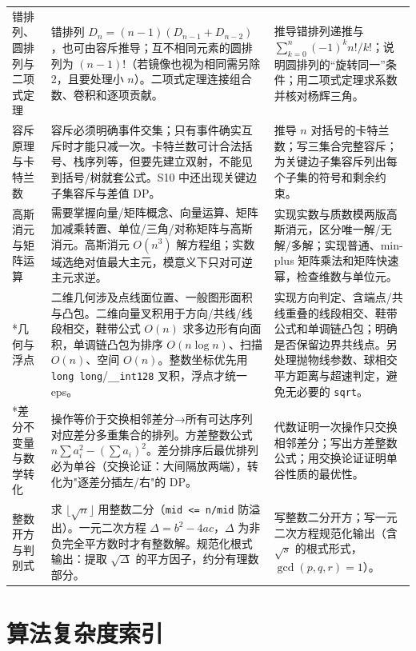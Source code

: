 \documentclass[a4paper,11pt]{article}
\newcommand{\code}[1]{\texttt{#1}}
\begin{document}
\begin{longtable}{L{2.4cm} L{7.5cm} L{6.8cm}}
错排列、圆排列与二项式定理
& 错排列 $D_n=(n-1)(D_{n-1}+D_{n-2})$，也可由容斥推导；互不相同元素的圆排列为 $(n-1)!$（若镜像也视为相同需另除 2，且要处理小 $n$）。二项式定理连接组合数、卷积和逐项贡献。
& 推导错排列递推与 $\sum_{k=0}^n(-1)^k n!/k!$；说明圆排列的“旋转同一”条件；用二项式定理求系数并核对杨辉三角。\\[2mm]

容斥原理与卡特兰数
& 容斥必须明确事件交集；只有事件确实互斥时才能只减一次。卡特兰数可计合法括号、栈序列等，但要先建立双射，不能见到括号/树就套公式。S10 中还出现关键边子集容斥与差值 DP。
& 推导 $n$ 对括号的卡特兰数；写三集合完整容斥；为关键边子集容斥列出每个子集的符号和剩余约束。\\[2mm]

高斯消元与矩阵运算
& 需要掌握向量/矩阵概念、向量运算、矩阵加减乘转置、单位/三角/对称矩阵与高斯消元。高斯消元 $O(n^3)$ 解方程组；实数域选绝对值最大主元，模意义下只对可逆主元求逆。
& 实现实数与质数模两版高斯消元，区分唯一解/无解/多解；实现普通、min-plus 矩阵乘法和矩阵快速幂，检查维数与单位元。\\[2mm]

*几何与浮点
& 二维几何涉及点线面位置、一般图形面积与凸包。二维向量叉积用于方向/共线/线段相交，鞋带公式 $O(n)$ 求多边形有向面积，单调链凸包为排序 $O(n\log n)$、扫描 $O(n)$、空间 $O(n)$。整数坐标优先用 \code{long long}/\code{\_\_int128} 叉积，浮点才统一 eps。
& 实现方向判定、含端点/共线重叠的线段相交、鞋带公式和单调链凸包；明确是否保留边界共线点。另处理抛物线参数、球相交平方距离与超速判定，避免无必要的 \code{sqrt}。\\[2mm]

*差分不变量与数学转化
& 操作等价于交换相邻差分→所有可达序列对应差分多重集合的排列。方差整数公式 $n\sum a_i^2-(\sum a_i)^2$。差分排序后最优排列必为单谷（交换论证：大间隔放两端），转化为"逐差分插左/右"的 DP。
& 代数证明一次操作只交换相邻差分；写出方差整数公式；用交换论证证明单谷性质的最优性。\\[2mm]

整数开方与判别式
& 求 $\lfloor\sqrt{n}\rfloor$ 用整数二分（\code{mid <= n/mid} 防溢出）。一元二次方程 $\Delta=b^2-4ac$，$\Delta$ 为非负完全平方数时才有整数解。规范化根式输出：提取 $\sqrt{\Delta}$ 的平方因子，约分有理数部分。
& 写整数二分开方；写一元二次方程规范化输出（含 $\sqrt{s}$ 的根式形式，$\gcd(p,q,r)=1$）。\\
\end{longtable}
\endgroup

\newpage
\section{算法复杂度索引}
\end{document}

